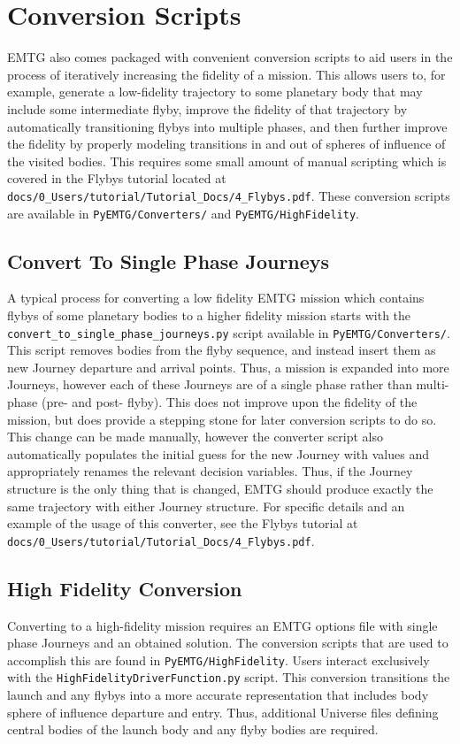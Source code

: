 \chapter{Conversion Scripts}
\label{chap:conversion}

\ac{EMTG} also comes packaged with convenient conversion scripts to aid users in the process of iteratively increasing the fidelity of a mission. This allows users to, for example, generate a low-fidelity trajectory to some planetary body that may include some intermediate flyby, improve the fidelity of that trajectory by automatically transitioning flybys into multiple phases, and then further improve the fidelity by properly modeling transitions in and out of spheres of influence of the visited bodies. This requires some small amount of manual scripting which is covered in the Flybys tutorial located at {\tt docs/0\_Users/tutorial/Tutorial\_Docs/4\_Flybys.pdf}. These conversion scripts are available in {\tt PyEMTG/Converters/} and {\tt PyEMTG/HighFidelity}.

\section{Convert To Single Phase Journeys}
A typical process for converting a low fidelity \ac{EMTG} mission which contains flybys of some planetary bodies to a higher fidelity mission starts with the {\tt convert\_to\_single\_phase\_journeys.py} script available in {\tt PyEMTG/Converters/}. This script removes bodies from the flyby sequence, and instead insert them as new Journey departure and arrival points. Thus, a mission is expanded into more Journeys, however each of these Journeys are of a single phase rather than multi-phase (pre- and post- flyby). This does not improve upon the fidelity of the mission, but does provide a stepping stone for later conversion scripts to do so. This change can be made manually, however the converter script also automatically populates the initial guess for the new Journey with values and appropriately renames the relevant decision variables. Thus, if the Journey structure is the only thing that is changed, \ac{EMTG} should produce exactly the same trajectory with either Journey structure. For specific details and an example of the usage of this converter, see the Flybys tutorial at {\tt docs/0\_Users/tutorial/Tutorial\_Docs/4\_Flybys.pdf}.


\section{High Fidelity Conversion}
Converting to a high-fidelity mission requires an \ac{EMTG} options file with single phase Journeys and an obtained solution. The conversion scripts that are used to accomplish this are found in {\tt PyEMTG/HighFidelity}. Users interact exclusively with the {\tt HighFidelityDriverFunction.py} script. This conversion transitions the launch and any flybys into a more accurate representation that includes body sphere of influence departure and entry. Thus, additional Universe files defining central bodies of the launch body and any flyby bodies are required.

